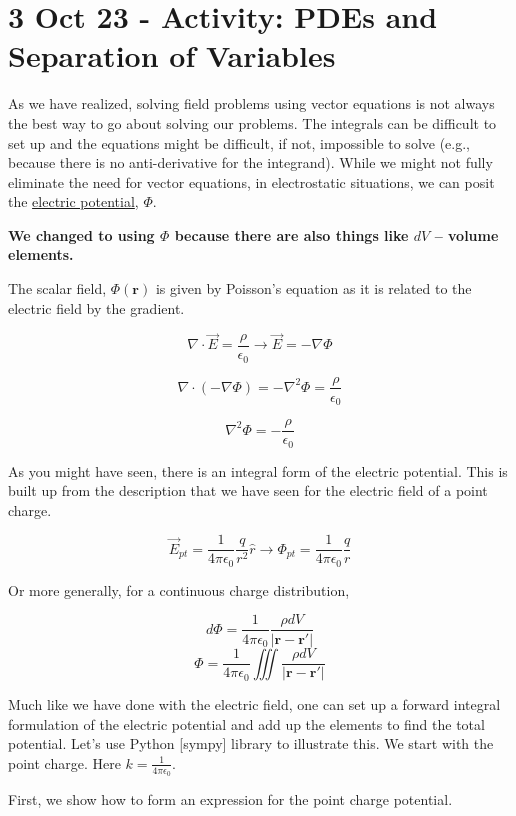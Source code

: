 \section{3 Oct 23 - Activity: PDEs and Separation of
Variables}\label{oct-23---activity-pdes-and-separation-of-variables}

As we have realized, solving field problems using vector equations is
not always the best way to go about solving our problems. The integrals
can be difficult to set up and the equations might be difficult, if not,
impossible to solve (e.g., because there is no anti-derivative for the
integrand). While we might not fully eliminate the need for vector
equations, in electrostatic situations, we can posit the
\href{https://en.wikipedia.org/wiki/Electric_potential}{electric
potential}, \(\Phi\).

\textbf{We changed to using \(\Phi\) because there are also things like
\(dV\) -- volume elements.}

The scalar field, \(\Phi(\mathbf{r})\) is given by Poisson's equation as
it is related to the electric field by the gradient.

\[\nabla \cdot \vec{E} = \frac{\rho}{\epsilon_0} \rightarrow \vec{E} = -\nabla \Phi\]

\[\nabla \cdot (-\nabla \Phi) = -\nabla^2 \Phi = \frac{\rho}{\epsilon_0}\]

\[\nabla^2 \Phi = -\frac{\rho}{\epsilon_0}\]

As you might have seen, there is an integral form of the electric
potential. This is built up from the description that we have seen for
the electric field of a point charge.

\[\vec{E}_{pt} = \frac{1}{4\pi\epsilon_0}\frac{q}{r^2}\hat{r} \rightarrow \Phi_{pt} = \frac{1}{4\pi\epsilon_0}\frac{q}{r}\]

Or more generally, for a continuous charge distribution,

\[d\Phi = \frac{1}{4\pi\epsilon_0}\frac{\rho dV}{|\mathbf{r}-\mathbf{r}'|}\]
\[\Phi = \frac{1}{4\pi\epsilon_0}\iiint\frac{\rho dV}{|\mathbf{r}-\mathbf{r}'|}\]

Much like we have done with the electric field, one can set up a forward
integral formulation of the electric potential and add up the elements
to find the total potential. Let's use Python {[}sympy{]} library to
illustrate this. We start with the point charge. Here
\(k=\frac{1}{4\pi\epsilon_0}\).

First, we show how to form an expression for the point charge potential.

